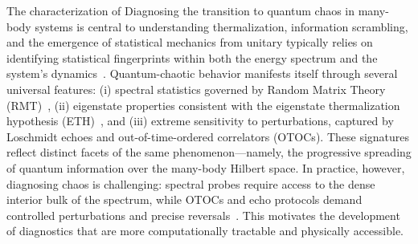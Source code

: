 \documentclass[pra,twocolumn,aps,showpacs,superscriptaddress,longbibliography]{revtex4-2}%
\providecommand{\DIFadd}[1]{{\protect\color{blue} \sf #1}} %
\providecommand{\DIFdel}[1]{{\protect\color{red} \scriptsize #1}} %
\providecommand{\DIFaddbegin}{} %
\providecommand{\DIFaddend}{} %
\providecommand{\DIFdelbegin}{} %
\providecommand{\DIFdelend}{} %
\begin{document}
\DIFdelbegin \DIFdel{The characterization of }\DIFdelend \DIFaddbegin \DIFadd{Diagnosing the transition to }\DIFaddend quantum chaos in many-body systems \DIFdelbegin \DIFdel{is central to understanding thermalization, information scrambling, and the emergence of statistical mechanics from unitary }\DIFdelend \DIFaddbegin \DIFadd{typically relies on identifying statistical fingerprints within both the energy spectrum and the system's }\DIFaddend dynamics~\cite{dalessio_2016_quantum}. Quantum-chaotic behavior manifests itself through several universal features: (i) spectral statistics governed by Random Matrix Theory (RMT)~\cite{bohigas_1984_characterization}, (ii) eigenstate properties consistent with the eigenstate thermalization hypothesis (ETH)~\cite{deutsch_1991_quantum}, and (iii) extreme sensitivity to perturbations, captured by Loschmidt echoes and out-of-time-ordered correlators (OTOCs). These signatures reflect distinct facets of the same phenomenon—namely, the progressive spreading of quantum information over the many-body Hilbert space. 
In practice, however, diagnosing chaos is challenging: spectral probes require access to the \DIFdelbegin \DIFdel{dense interior }\DIFdelend \DIFaddbegin \DIFadd{bulk }\DIFaddend of the spectrum, while OTOCs and echo protocols demand controlled perturbations and precise reversals~\cite{bardarson2012unbounded,santos2010onset,alba2017entanglement,smith2016many}.
This motivates the development of diagnostics that are more computationally tractable and physically accessible.
\end{document}
